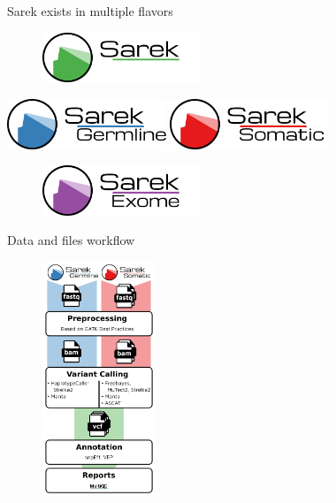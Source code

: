 \documentclass[usepdftitle=false]{beamer}
\begin{document}
\begin{frame}{Sarek exists in multiple flavors}
	\begin{figure}
		\includegraphics[height=1.5cm]{pictures/Sarek}
	\end{figure}
	\vfill
	\pause
	\begin{center}
		\includegraphics[height=1.5cm]{pictures/Sarek_germline}
		\hfill
		\includegraphics[height=1.5cm]{pictures/Sarek_somatic}
	\end{center}
	\pause
	\begin{figure}
		\includegraphics[height=1.5cm]{pictures/Sarek_exome}
	\end{figure}
\end{frame}

\begin{frame}{Data and files workflow}
	\begin{figure}
		\includegraphics[height=7cm]{pictures/Sarek_2-2_workflow}
	\end{figure}
\end{frame}
\end{document}
